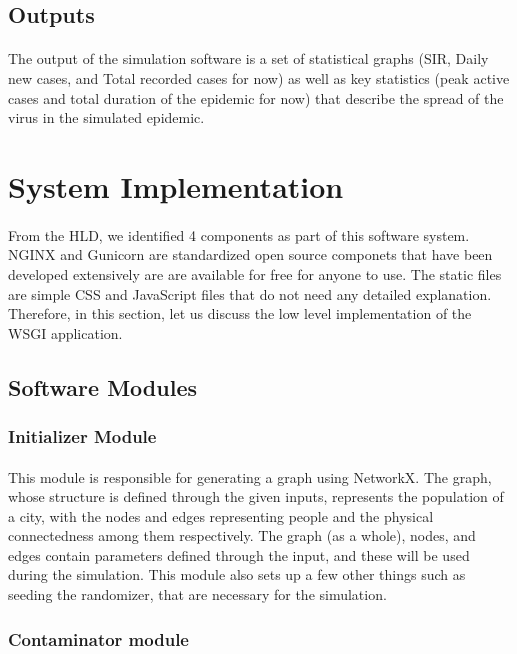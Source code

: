 \documentclass[12pt, a4paper]{extarticle}
\begin{document}
        \subsection{Outputs}
            \paragraph{} The output of the simulation software is a set of statistical graphs (SIR, Daily new cases, and Total recorded cases for now) as well as key statistics (peak active cases and total duration of the epidemic for now) that describe the spread of the virus in the simulated epidemic.
    \newpage
    \section{System Implementation}
        \paragraph{} From the HLD, we identified 4 components as part of this software system. NGINX and Gunicorn are standardized open source componets that have been developed extensively are are available for free for anyone to use. The static files are simple CSS and JavaScript files that do not need any detailed explanation. Therefore, in this section, let us discuss the low level implementation of the WSGI application.
        \subsection{Software Modules}
			\subsubsection{Initializer Module}
				\paragraph{} This module is responsible for generating a graph using NetworkX. The graph, whose structure is defined through the given inputs, represents the population of a city, with the nodes and edges representing people and the physical connectedness among them respectively. The graph (as a whole), nodes, and edges contain parameters defined through the input, and these will be used during the simulation. This module also sets up a few other things such as seeding the randomizer, that are necessary for the simulation.
			\subsubsection{Contaminator module}
\end{document}
